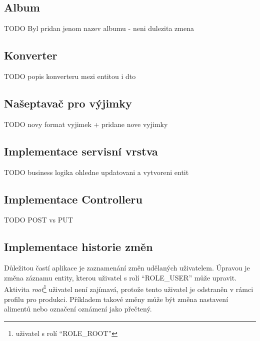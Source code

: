     \subsection{Album}
        TODO Byl pridan jenom nazev albumu - neni dulezita zmena
        
    \subsection{Konverter}
        TODO popis konverteru mezi entitou i dto
        
    \subsection{Našeptavač pro výjimky}
        TODO novy format vyjimek + pridane nove vyjimky
        
    \subsection{Implementace servisní vrstva}%
        TODO business logika ohledne updatovani a vytvoreni entit
        
    \subsection{Implementace Controlleru}
        TODO POST vs PUT
    
    \subsection{Implementace historie změn}
        Důležitou častí aplikace je zaznamenání změn udělaných uživatelem. Úpravou je změna záznamu entity, kterou uživatel s rolí \enquote{ROLE\_USER} může upravit. Aktivita \textit{root}\footnote{uživatel s rolí \enquote{ROLE\_ROOT}} uživatel není zajímavá, protože tento uživatel je odstraněn v rámci profilu pro produkci. Příkladem takové změny může být změna nastavení alimentů nebo označení oznámení jako přečtený.
    
